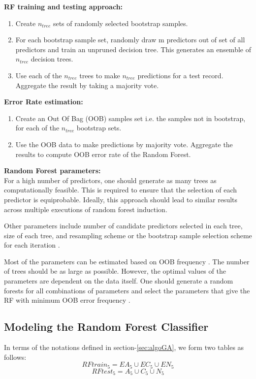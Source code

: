 	\textbf{RF training and testing approach:}
	\begin{enumerate}
	\item Create $n_{tree}$ sets of randomly selected bootstrap samples.
	\item For each bootstrap sample set, randomly draw m predictors out of set of all predictors and train an unpruned decision tree. This generates an ensemble of $n_{tree}$ decision trees.
	\item Use each of the $n_{tree}$ trees to make $n_{tree}$ predictions for a test record. Aggregate the result by taking a majority vote.
	\end{enumerate}

	\textbf{Error Rate estimation:}
	\begin{enumerate}
	\item Create an Out Of Bag (OOB) samples set i.e. the samples not in bootstrap, for each of the $n_{tree}$ bootstrap sets. 
	\item Use the OOB data to make predictions by majority vote. Aggregate the results to compute OOB error rate of the Random Forest.
	\end{enumerate}
	
	\textbf{Random Forest parameters:} \\
	For a high number of predictors, one should generate as many trees as computationally feasible. This is required to ensure that the selection of each predictor is equiprobable. Ideally, this approach should lead to similar results across multiple executions of random forest induction. \par
	Other parameters include number of candidate predictors selected in each tree, size of each tree, and resampling scheme or the bootstrap sample selection scheme for each iteration \cite{rf1}. \par
	Most of the parameters can be estimated based on OOB frequency . The number of trees should be as large as possible. However, the optimal values of the parameters are dependent on the data itself. One should generate a random forests for all combinations of parameters and select the parameters that give the RF with minimum OOB error frequency \cite{rf1}.
	
	\subsection{Modeling the Random Forest Classifier}
	In terms of the notations defined in section-\ref{sec:algoGA}, we form two tables as follows:
	$$ RFtrain_5 = EA_5 \cup EC_5 \cup EN_5$$
	$$ RFtest_5 = A_5 \cup C_5 \cup N_5$$
	

